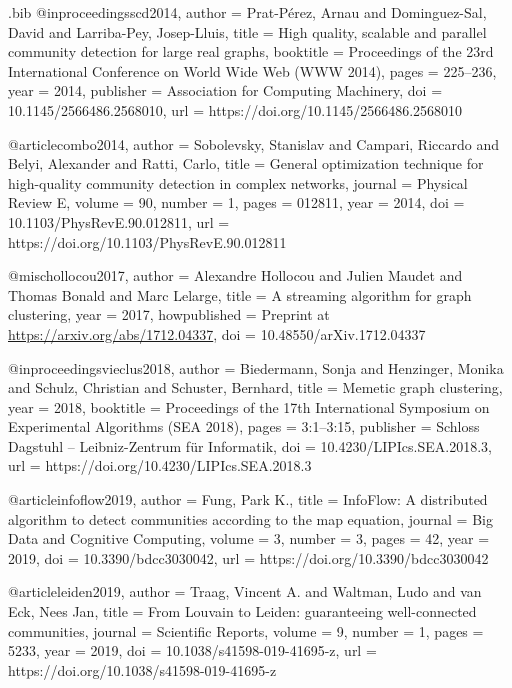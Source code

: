 \documentclass[11pt,a4paper]{article}
\begin{document}
\begin{filecontents*}[overwrite]{\jobname.bib}
@inproceedings{scd2014,
  author    = {Prat-P{\'e}rez, Arnau and Dominguez-Sal, David and Larriba-Pey, Josep-Lluis},
  title     = {High quality, scalable and parallel community detection for large real graphs},
  booktitle = {Proceedings of the 23rd International Conference on World Wide Web (WWW 2014)},
  pages     = {225--236},
  year      = {2014},
  publisher = {Association for Computing Machinery},
  doi       = {10.1145/2566486.2568010},
  url       = {https://doi.org/10.1145/2566486.2568010}
}

@article{combo2014,
  author  = {Sobolevsky, Stanislav and Campari, Riccardo and Belyi, Alexander and Ratti, Carlo},
  title   = {General optimization technique for high-quality community detection in complex networks},
  journal = {Physical Review E},
  volume  = {90},
  number  = {1},
  pages   = {012811},
  year    = {2014},
  doi     = {10.1103/PhysRevE.90.012811},
  url     = {https://doi.org/10.1103/PhysRevE.90.012811}
}

@misc{hollocou2017,
  author       = {Alexandre Hollocou and Julien Maudet and Thomas Bonald and Marc Lelarge},
  title        = {A streaming algorithm for graph clustering},
  year         = {2017},
  howpublished = {Preprint at \url{https://arxiv.org/abs/1712.04337}},
  doi          = {10.48550/arXiv.1712.04337}
}

@inproceedings{vieclus2018,
  author    = {Biedermann, Sonja and Henzinger, Monika and Schulz, Christian and Schuster, Bernhard},
  title     = {Memetic graph clustering},
  year      = {2018},
  booktitle = {Proceedings of the 17th International Symposium on Experimental Algorithms (SEA 2018)},
  pages     = {3:1--3:15},
  publisher = {Schloss Dagstuhl -- Leibniz-Zentrum f{\"u}r Informatik},
  doi       = {10.4230/LIPIcs.SEA.2018.3},
  url       = {https://doi.org/10.4230/LIPIcs.SEA.2018.3}
}

@article{infoflow2019,
  author  = {Fung, Park K.},
  title   = {{InfoFlow}: A distributed algorithm to detect communities according to the map equation},
  journal = {Big Data and Cognitive Computing},
  volume  = {3},
  number  = {3},
  pages   = {42},
  year    = {2019},
  doi     = {10.3390/bdcc3030042},
  url     = {https://doi.org/10.3390/bdcc3030042}
}

@article{leiden2019,
  author  = {Traag, Vincent A. and Waltman, Ludo and van Eck, Nees Jan},
  title   = {From {Louvain} to {Leiden}: guaranteeing well-connected communities},
  journal = {Scientific Reports},
  volume  = {9},
  number  = {1},
  pages   = {5233},
  year    = {2019},
  doi     = {10.1038/s41598-019-41695-z},
  url     = {https://doi.org/10.1038/s41598-019-41695-z}
}


\end{filecontents*}
\end{document}
